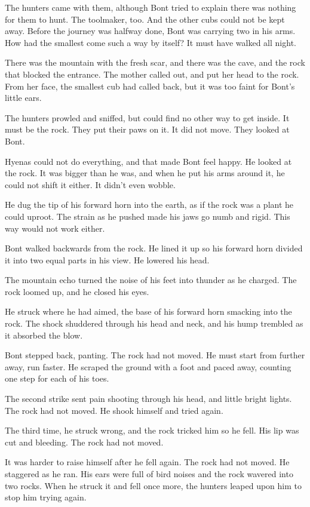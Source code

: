 \secdiv

The hunters came with them, although Bont tried to explain there was nothing for them to hunt. The toolmaker, too. And the other cubs could not be kept away. Before the journey was halfway done, Bont was carrying two in his arms. How had the smallest come such a way by itself? It must have walked all night.

There was the mountain with the fresh scar, and there was the cave, and the rock that blocked the entrance. The mother called out, and put her head to the rock. From her face, the smallest cub had called back, but it was too faint for Bont's little ears.

The hunters prowled and sniffed, but could find no other way to get inside. It must be the rock. They put their paws on it. It did not move. They looked at Bont.

Hyenas could not do everything, and that made Bont feel happy. He looked at the rock. It was bigger than he was, and when he put his arms around it, he could not shift it either. It didn't even wobble.

He dug the tip of his forward horn into the earth, as if the rock was a plant he could uproot. The strain as he pushed made his jaws go numb and rigid. This way would not work either.

Bont walked backwards from the rock. He lined it up so his forward horn divided it into two equal parts in his view. He lowered his head.

The mountain echo turned the noise of his feet into thunder as he charged. The rock loomed up, and he closed his eyes.

He struck where he had aimed, the base of his forward horn smacking into the rock. The shock shuddered through his head and neck, and his hump trembled as it absorbed the blow.

Bont stepped back, panting. The rock had not moved. He must start from further away, run faster. He scraped the ground with a foot and paced away, counting one step for each of his toes.

The second strike sent pain shooting through his head, and little bright lights. The rock had not moved. He shook himself and tried again.

The third time, he struck wrong, and the rock tricked him so he fell. His lip was cut and bleeding. The rock had not moved.

It was harder to raise himself after he fell again. The rock had not moved. He staggered as he ran. His ears were full of bird noises and the rock wavered into two rocks. When he struck it and fell once more, the hunters leaped upon him to stop him trying again.

